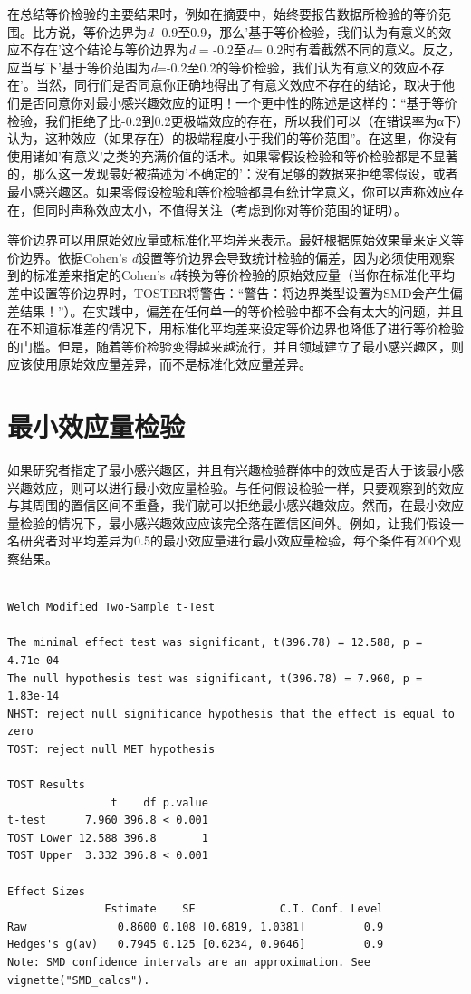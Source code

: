 \documentclass[
  letterpaper,
  DIV=11,
  numbers=noendperiod]{scrreprt}
\begin{document}
在总结等价检验的主要结果时，例如在摘要中，始终要报告数据所检验的等价范围。比方说，等价边界为\emph{d}
-0.9至0.9，那么'基于等价检验，我们认为有意义的效应不存在'这个结论与等价边界为\emph{d}
= -0.2至\emph{d}=
0.2时有着截然不同的意义。反之，应当写下'基于等价范围为\emph{d}=-0.2至0.2的等价检验，我们认为有意义的效应不存在'。当然，同行们是否同意你正确地得出了有意义效应不存在的结论，取决于他们是否同意你对最小感兴趣效应的证明！一个更中性的陈述是这样的：``基于等价检验，我们拒绝了比-0.2到0.2更极端效应的存在，所以我们可以（在错误率为α下）认为，这种效应（如果存在）的极端程度小于我们的等价范围''。在这里，你没有使用诸如'有意义'之类的充满价值的话术。如果零假设检验和等价检验都是不显著的，那么这一发现最好被描述为'不确定的'：没有足够的数据来拒绝零假设，或者最小感兴趣区。如果零假设检验和等价检验都具有统计学意义，你可以声称效应存在，但同时声称效应太小，不值得关注（考虑到你对等价范围的证明）。

等价边界可以用原始效应量或标准化平均差来表示。最好根据原始效果量来定义等价边界。依据Cohen's
\emph{d}设置等价边界会导致统计检验的偏差，因为必须使用观察到的标准差来指定的Cohen's
\emph{d}转换为等价检验的原始效应量（当你在标准化平均差中设置等价边界时，TOSTER将警告：``警告：将边界类型设置为SMD会产生偏差结果！''）。在实践中，偏差在任何单一的等价检验中都不会有太大的问题，并且在不知道标准差的情况下，用标准化平均差来设定等价边界也降低了进行等价检验的门槛。但是，随着等价检验变得越来越流行，并且领域建立了最小感兴趣区，则应该使用原始效应量差异，而不是标准化效应量差异。

\hypertarget{sec-MET}{%
\section{最小效应量检验}\label{sec-MET}}

如果研究者指定了最小感兴趣区，并且有兴趣检验群体中的效应是否大于该最小感兴趣效应，则可以进行最小效应量检验。与任何假设检验一样，只要观察到的效应与其周围的置信区间不重叠，我们就可以拒绝最小感兴趣效应。然而，在最小效应量检验的情况下，最小感兴趣效应应该完全落在置信区间外。例如，让我们假设一名研究者对平均差异为0.5的最小效应量进行最小效应量检验，每个条件有200个观察结果。

\begin{verbatim}

Welch Modified Two-Sample t-Test

The minimal effect test was significant, t(396.78) = 12.588, p = 4.71e-04
The null hypothesis test was significant, t(396.78) = 7.960, p = 1.83e-14
NHST: reject null significance hypothesis that the effect is equal to zero 
TOST: reject null MET hypothesis

TOST Results 
                t    df p.value
t-test      7.960 396.8 < 0.001
TOST Lower 12.588 396.8       1
TOST Upper  3.332 396.8 < 0.001

Effect Sizes 
               Estimate    SE             C.I. Conf. Level
Raw              0.8600 0.108 [0.6819, 1.0381]         0.9
Hedges's g(av)   0.7945 0.125 [0.6234, 0.9646]         0.9
Note: SMD confidence intervals are an approximation. See vignette("SMD_calcs").
\end{verbatim}
\end{document}
